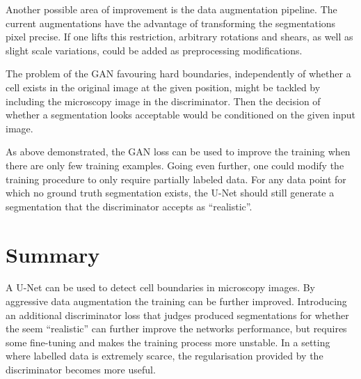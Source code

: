 \documentclass[aps,prl,twocolumn,groupedaddress,amsmath,amssymb]{revtex4-1}
\begin{document}
    Another possible area of improvement is the data augmentation pipeline.
    The current augmentations have the advantage of transforming the
    segmentations pixel precise. If one lifts this restriction, arbitrary
    rotations and shears, as well as slight scale variations, could be added
    as preprocessing modifications.

    The problem of the GAN favouring hard boundaries, independently of whether
    a cell exists in the original image at the given position, might be
    tackled by including the microscopy image in the discriminator. Then the
    decision of whether a segmentation looks acceptable would be conditioned
    on the given input image.

    As above demonstrated, the GAN loss can be used to improve the training
    when there are only few training examples. Going even further, one could
    modify the training procedure to only require partially labeled data. For
    any data point for which no ground truth segmentation exists, the U-Net
    should still generate a segmentation that the discriminator accepts as
    ``realistic''.


    \section{Summary}

    A U-Net can be used to detect cell boundaries in microscopy images. By
    aggressive data augmentation the training can be further improved.
    Introducing an additional discriminator loss that judges produced
    segmentations for whether the seem ``realistic'' can further improve the
    networks performance, but requires some fine-tuning and makes the training
    process more unstable. In a setting where labelled data is extremely
    scarce, the regularisation provided by the discriminator becomes more
    useful.




    
     
\end{document}
